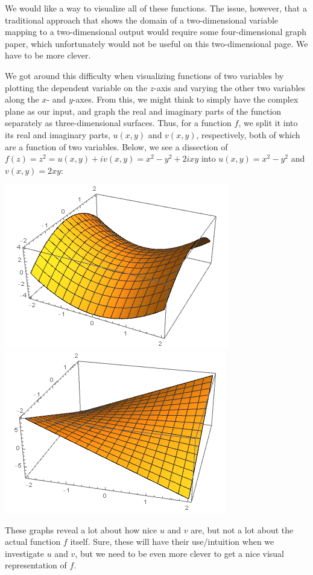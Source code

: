 \documentclass[12pt]{scrartcl}
\begin{document}
We would like a way to visualize all of these functions. The issue, however, that a traditional approach that shows the domain of a two-dimensional variable mapping to a two-dimensional output would require some four-dimensional graph paper, which unfortunately would not be useful on this two-dimensional page. We have to be more clever.

We got around this difficulty when visualizing functions of two variables by plotting the dependent variable on the $z$-axis and varying the other two variables along the $x$- and $y$-axes. From this, we might think to simply have the complex plane as our input, and graph the real and imaginary parts of the function separately as three-dimensional surfaces. Thus, for a function $f$, we split it into its real and imaginary parts, $u(x,y)$ and $v(x,y)$, respectively, both of which are a function of two variables. Below, we see a dissection of $f(z) = z^2 = u(x,y) + i v(x,y) = x^2-y^2 + 2ixy$ into $u(x,y) = x^2 - y^2$ and $v(x,y) = 2xy$:
\begin{center}
	\includegraphics[scale=0.5]{images/rezsqr.png}
	\includegraphics[scale=0.5]{images/imzsqr.png}
\end{center}
These graphs reveal a lot about how nice $u$ and $v$ are, but not a lot about the actual function $f$ itself. Sure, these will have their use/intuition when we investigate $u$ and $v$, but we need to be even more clever to get a nice visual representation of $f$.
\end{document}
